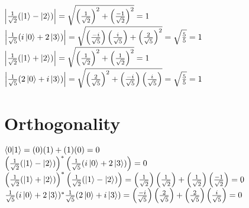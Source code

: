 \documentclass{iansnotes}
\begin{document}
$\left|\frac{1}{\sqrt{2}}(\ket{1} - \ket{2})\right| = \sqrt{\left(\frac{1}{\sqrt{2}}\right)^2 + \left(\frac{-1}{\sqrt{2}}\right)^2} = 1$ \\[5mm]
$\left|\frac{1}{\sqrt{5}}(i\ket{0} + 2\ket{3})\right| = \sqrt{\left(\frac{-i}{\sqrt{5}}\right)\left(\frac{i}{\sqrt{5}}\right) + \left(\frac{2}{\sqrt{5}}\right)^2} = \sqrt{\frac{5}{5}} = 1$ \\[5mm]
$\left|\frac{1}{\sqrt{2}}(\ket{1} + \ket{2})\right| = \sqrt{\left(\frac{1}{\sqrt{2}}\right)^2 + \left(\frac{1}{\sqrt{2}}\right)^2} = 1$ \\[5mm]
$\left|\frac{1}{\sqrt{5}}(2\ket{0} + i\ket{3})\right| = \sqrt{\left(\frac{2}{\sqrt{5}}\right)^2 + \left(\frac{-i}{\sqrt{5}}\right)\left(\frac{i}{\sqrt{5}}\right)} = \sqrt{\frac{5}{5}} = 1$ \\[5mm]

\section{Orthogonality}

$\braket{0|1} = (0)(1) + (1)(0) = 0$ \\[5mm]
$\left(\frac{1}{\sqrt{2}}(\ket{1} - \ket{2})\right)^* \left(\frac{1}{\sqrt{5}}(i\ket{0} + 2\ket{3}) \right) = 0$ \\[5mm]
$\left(\frac{1}{\sqrt{2}}(\ket{1} + \ket{2})\right)^* \left(\frac{1}{\sqrt{2}}(\ket{1} - \ket{2})\right) = \left(\frac{1}{\sqrt{2}}\right)\left(\frac{1}{\sqrt{2}}\right) + \left(\frac{1}{\sqrt{2}}\right)\left(\frac{-1}{\sqrt{2}}\right) =  0$ \\[5mm]
$\frac{1}{\sqrt{5}}(i\ket{0} + 2\ket{3})^* \frac{1}{\sqrt{5}}(2\ket{0} + i\ket{3}) = \left(\frac{-i}{\sqrt{5}}\right)\left(\frac{2}{\sqrt{5}}\right) + \left(\frac{2}{\sqrt{5}}\right)\left(\frac{i}{\sqrt{5}}\right) =  0$ \\[5mm]
\end{document}

